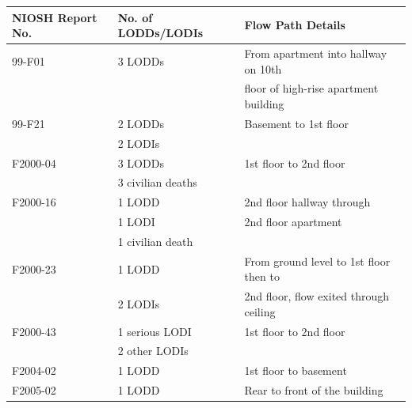 \documentclass[12pt,oneside]{book}
\begin{document}
\begin{table}
\centering
{}\label{tab:lodd}
\begin{tabular}{lll}
\toprule[1.5pt]
NIOSH Report No. & No. of LODDs/LODIs & Flow Path Details  \\
\midrule
99-F01   \cite{NIOSH:Pettit}        &  3 LODDs            &  From apartment into hallway on 10th                  \\
                                    &                     &  floor of high-rise apartment building                \\
99-F21   \cite{NIOSH:Washenitz}     &  2 LODDs            &  Basement to 1st floor                                \\
                                    &  2 LODIs            &                                                       \\
F2000-04 \cite{NIOSH:Mezzanotte}    &  3 LODDs            &  1st floor to 2nd floor                               \\
                                    &  3 civilian deaths  &                                                       \\
F2000-16 \cite{NIOSH:McFall}        &  1 LODD             &  2nd floor hallway through                            \\
                                    &  1 LODI             &  2nd floor apartment                                  \\
                                    &  1 civilian death   &                                                       \\
F2000-23 \cite{NIOSH:McFall2}       &  1 LODD             &  From ground level to 1st floor then to               \\
                                    &  2 LODIs            &  2nd floor, flow exited through ceiling               \\
F2000-43 \cite{NIOSH:McFall3}       &  1 serious LODI     &  1st floor to 2nd floor                               \\
                                    &  2 other LODIs      &                                                       \\
F2004-02 \cite{NIOSH:Berardinelli}  &  1 LODD             &  1st floor to basement                                \\
F2005-02 \cite{NIOSH:Koedam}        &  1 LODD             &  Rear to front of the building                        \\

\end{tabular}
\end{table}
\end{document}
